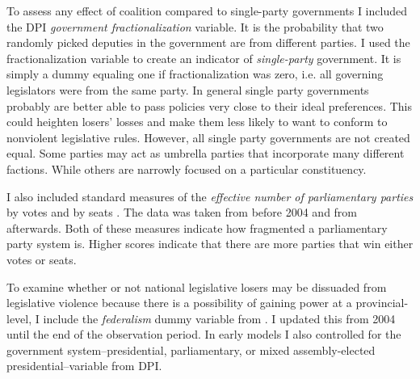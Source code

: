\documentclass[a4paper]{article}\usepackage{graphicx, color}
\begin{document}
To assess any effect of coalition compared to single-party governments I included the DPI {\emph{government fractionalization}} variable. It is the probability that two randomly picked deputies in the government are from different parties. I used the fractionalization variable to create an indicator of {\emph{single-party}} government. It is simply a dummy equaling one if fractionalization was zero, i.e. all governing legislators were from the same party. In general single party governments probably are better able to pass policies very close to their ideal preferences. This could heighten losers' losses and make them less likely to want to conform to nonviolent legislative rules. However, all single party governments are not created equal. Some parties may act as umbrella parties that incorporate many different factions. While others are narrowly focused on a particular constituency. 

I also included standard measures of the \emph{effective number of parliamentary parties} by votes and by seats \citep[see][]{Laakso1979, Taagepera1989}. The data was taken from \cite{Carey2011} before 2004 and from \cite{Gallagher2012} afterwards. Both of these measures indicate how fragmented a parliamentary party system is. Higher scores indicate that there are more parties that win either votes or seats.

To examine whether or not national legislative losers may be dissuaded from legislative violence because there is a possibility of gaining power at a provincial-level, I include the \emph{federalism} dummy variable from \cite{Carey2011}. I updated this from 2004 until the end of the observation period. In early models I also controlled for the government system–presidential, parliamentary, or mixed assembly-elected presidential–variable from DPI.
\end{document}
